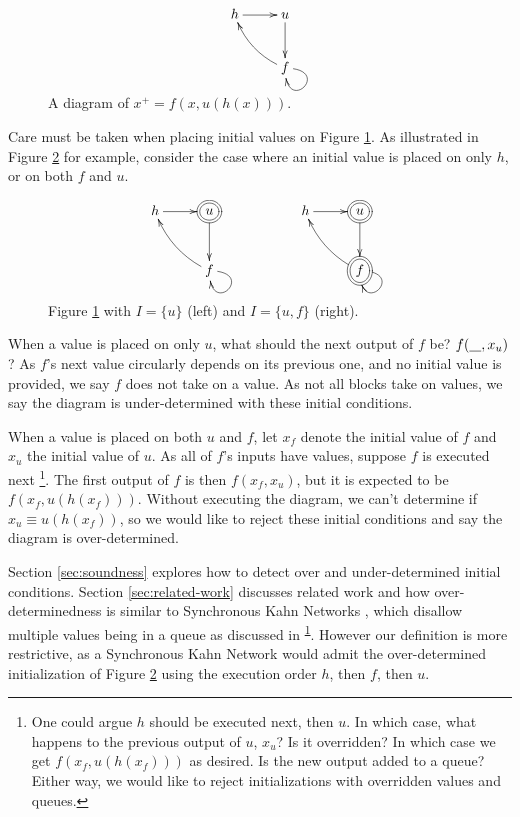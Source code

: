 \documentclass[twocolumn]{article}
\begin{document}
\begin{figure}[h]
\[
    \xymatrix {
        h \ar[r] & u \ar[d] \\
        & f \ar@/^/[lu] \ar@(r, d)[]
    }
\]
    \caption{A diagram of $x^+=f(x,u(h(x)))$.}
    \label{fig:v2dynamical}
\end{figure}

Care must be taken when placing initial values on Figure \ref{fig:v2dynamical}. As illustrated in Figure \ref{fig:meow} for example, consider the case where an initial value is placed on only $h$, or on both $f$ and $u$.

\begin{figure}[h]
\[
    \xymatrix {
        h \ar[r] & *++[o][F=]{u} \ar[d] && h \ar[r] & *++[o][F=]{u} \ar[d] \\
        & f \ar@/^/[lu] \ar@(r, d)[] && & *++[o][F=]{f} \ar@/^/[lu] \ar@(r, d)[]
    }
\]
    \caption{Figure \ref{fig:v2dynamical} with $I=\{u\}$ (left) and $I=\{u, f\}$ (right).}
    \label{fig:meow}
\end{figure}

When a value is placed on only $u$, what should the next output of $f$ be? $f(\underline{\hspace{0.3cm}}, x_u)$? As $f$'s next value circularly depends on its previous one, and no initial value is provided, we say $f$ does not take on a value. As not all blocks take on values, we say the diagram is under-determined with these initial conditions.

When a value is placed on both $u$ and $f$, let $x_f$ denote the initial value of $f$ and $x_u$ the initial value of $u$. As all of $f$'s inputs have values, suppose $f$ is executed next \footnote{\label{footnote} One could argue $h$ should be executed next, then $u$. In which case, what happens to the previous output of $u$, $x_u$? Is it overridden? In which case we get $f(x_f, u(h(x_f)))$ as desired. Is the new output added to a queue? Either way, we would like to reject initializations with overridden values and queues.}. The first output of $f$ is then $f(x_f, x_u)$, but it is expected to be $f(x_f, u(h(x_f)))$. Without executing the diagram, we can't determine if $x_u\equiv u(h(x_f))$, so we would like to reject these initial conditions and say the diagram is over-determined.

Section \ref{sec:soundness} explores how to detect over and under-determined initial conditions. Section \ref{sec:related-work} discusses related work and how over-determinedness is similar to Synchronous Kahn Networks \cite{SyncKahn}, which disallow multiple values being in a queue as discussed in \textsuperscript{\ref{footnote}}. However our definition is more restrictive, as a Synchronous Kahn Network would admit the over-determined initialization of Figure \ref{fig:meow} using the execution order $h$, then $f$, then $u$.
\end{document}
